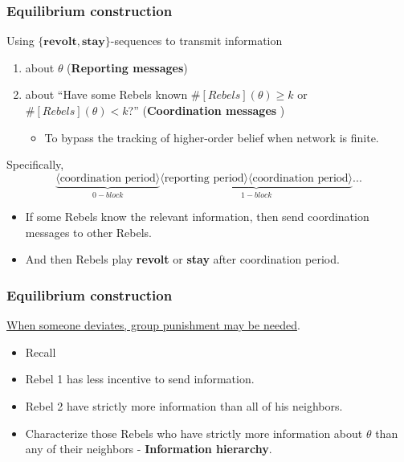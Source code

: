 \documentclass[10pt]{beamer}
\begin{document}
\begin{frame}
  \frametitle{Equilibrium construction}

Using $\{\textbf{revolt}, \textbf{stay}\}$-sequences to transmit information 
\begin{enumerate}
\item about $\theta$ (\textbf{Reporting messages})
\item about ``Have some Rebels known $\#[Rebels](\theta)\geq k$ or $\#[Rebels](\theta)< k$?'' (\textbf{Coordination messages} )
\begin{itemize}
\item To bypass the tracking of higher-order belief when network is finite.
\end{itemize}
\end{enumerate}
Specifically,
\[\underbrace{\langle\text{coordination period}\rangle}_{0-block}\underbrace{\langle\text{reporting period}\rangle \langle\text{coordination period}\rangle}_{1-block}...\]

\begin{itemize}
\item If some Rebels know the relevant information, then send coordination messages to other Rebels.
\item And then Rebels play \textbf{revolt} or \textbf{stay} after coordination period. 
\end{itemize}

\end{frame}


\begin{frame}
  \frametitle{Equilibrium construction}

\underline{When someone deviates, group punishment may be needed}.
 
  \begin{itemize}
  \item Recall
    \begin{center}
\end{center}
   \item Rebel 1 has less incentive to send information.
   \item Rebel 2 have strictly more information than all of his neighbors.
   
  \item Characterize those Rebels who have strictly more information about $\theta$ than any of their neighbors - \textbf{Information hierarchy}.

  \end{itemize}

\end{frame}
\end{document}
